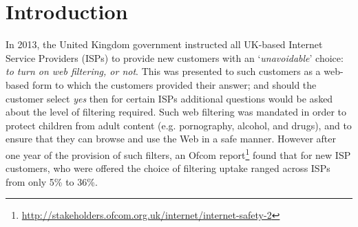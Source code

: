 \documentclass{bmcart}
\begin{document}


\section*{Introduction}


In 2013, the United Kingdom government instructed all UK-based Internet Service Providers (ISPs) to provide new customers with an `\textit{unavoidable}' choice: \textit{to turn on web filtering, or not}. 
This was presented to such customers as a web-based form to which the customers provided their answer; and should the customer select \textit{yes} then for certain ISPs additional questions would be asked about the level of filtering required.
Such web filtering was mandated in order to protect children from adult content (e.g. pornography, alcohol, and drugs), and to ensure that they can browse and use the Web in a safe manner.
However after one year of the provision of such filters, an Ofcom report\footnote{\url{http://stakeholders.ofcom.org.uk/internet/internet-safety-2}} found that for new ISP customers, who were offered the choice of filtering uptake ranged across ISPs from only 5\% to 36\%.
\end{document}
